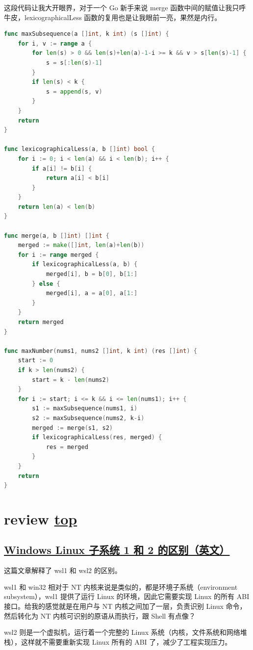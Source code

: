 这段代码让我大开眼界，对于一个 Go 新手来说 merge 函数中间的赋值让我只呼牛皮，lexicographicalLess 函数的复用也是让我眼前一亮，果然是内行。

\begin{lstlisting}[language=Go]
func maxSubsequence(a []int, k int) (s []int) {
    for i, v := range a {
        for len(s) > 0 && len(s)+len(a)-1-i >= k && v > s[len(s)-1] {
            s = s[:len(s)-1]
        }
        if len(s) < k {
            s = append(s, v)
        }
    }
    return
}

func lexicographicalLess(a, b []int) bool {
    for i := 0; i < len(a) && i < len(b); i++ {
        if a[i] != b[i] {
            return a[i] < b[i]
        }
    }
    return len(a) < len(b)
}

func merge(a, b []int) []int {
    merged := make([]int, len(a)+len(b))
    for i := range merged {
        if lexicographicalLess(a, b) {
            merged[i], b = b[0], b[1:]
        } else {
            merged[i], a = a[0], a[1:]
        }
    }
    return merged
}

func maxNumber(nums1, nums2 []int, k int) (res []int) {
    start := 0
    if k > len(nums2) {
        start = k - len(nums2)
    }
    for i := start; i <= k && i <= len(nums1); i++ {
        s1 := maxSubsequence(nums1, i)
        s2 := maxSubsequence(nums2, k-i)
        merged := merge(s1, s2)
        if lexicographicalLess(res, merged) {
            res = merged
        }
    }
    return
}
\end{lstlisting}

\section{review \hyperref[chap:w6]{top}}\label{w6:review}

\subsection{\href{https://jmmv.dev/2020/11/wsl-lost-potential.html}{Windows Linux 子系统 1 和 2 的区别（英文）}}

这篇文章解释了 wsl1 和 wsl2 的区别。

wsl1 和 win32 相对于 NT 内核来说是类似的，都是环境子系统（environment subsystem），wsl1 提供了运行 Linux 的环境，因此它需要实现 Linux 的所有 ABI 接口。给我的感觉就是在用户与 NT 内核之间加了一层，负责识别 Linux 命令，然后转化为 NT 内核可识别的原语从而执行，跟 Shell 有点像？

wsl2 则是一个虚拟机，运行着一个完整的 Linux 系统（内核，文件系统和网络堆栈），这样就不需要重新实现 Linux 所有的 ABI 了，减少了工程实现压力。

